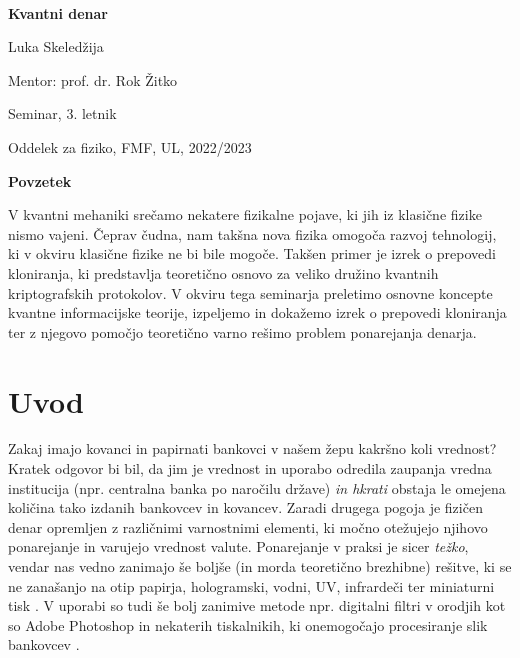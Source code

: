 \documentclass[12pt]{article}
\begin{document}
 $~$ 
 
 \vspace{2cm}
 
 \centerline{\bf \huge   Kvantni denar}
 
 \vspace{1cm}
 
  \centerline{\huge  Luka Skeledžija}
  
   \vspace{1cm}
  
  \centerline{\large Mentor: prof. dr. Rok Žitko}
  
  \vspace{1cm}
  
  \centerline{\large Seminar, 3. letnik}
  
  \vspace{1cm}
  
  \centerline{\large Oddelek za fiziko, FMF, UL, 2022/2023}
  
  \vspace{6cm}
  
  \begin{minipage}[c]{0.9\hsize}
  {\bf Povzetek}
  
  V kvantni mehaniki srečamo nekatere fizikalne pojave, ki jih iz klasične fizike nismo vajeni. Čeprav čudna, nam takšna nova fizika omogoča razvoj tehnologij, ki v okviru klasične fizike ne bi bile mogoče. Takšen primer je izrek o prepovedi kloniranja, ki predstavlja teoretično osnovo za veliko družino kvantnih kriptografskih protokolov. V okviru tega seminarja preletimo osnovne koncepte kvantne informacijske teorije, izpeljemo in dokažemo izrek o prepovedi kloniranja ter z njegovo pomočjo teoretično varno rešimo problem ponarejanja denarja. 
    \end{minipage}

 
 \newpage
 
 \tableofcontents
 \listoffigures
 \listoftables


 \newpage
  
  
 \section{Uvod}
	Zakaj imajo kovanci in papirnati bankovci v našem žepu kakršno koli vrednost? Kratek odgovor bi bil, da jim je vrednost in uporabo odredila zaupanja vredna institucija (npr. centralna banka po naročilu države) \emph{in hkrati} obstaja le omejena količina tako izdanih bankovcev in kovancev. Zaradi drugega pogoja je fizičen denar opremljen z različnimi varnostnimi elementi, ki močno otežujejo njihovo ponarejanje in varujejo vrednost valute. Ponarejanje v praksi je sicer \emph{težko}, vendar nas vedno zanimajo še boljše (in morda teoretično brezhibne) rešitve, ki se ne zanašanjo na otip papirja, hologramski, vodni, UV, infrardeči ter miniaturni tisk \cite{bankSecurityFeatures2018}.  V uporabi so tudi še bolj zanimive metode npr. digitalni filtri v orodjih kot so Adobe Photoshop in nekaterih tiskalnikih, ki onemogočajo procesiranje slik bankovcev \cite{SoftwareDetectionCurrency}. 
\end{document}
